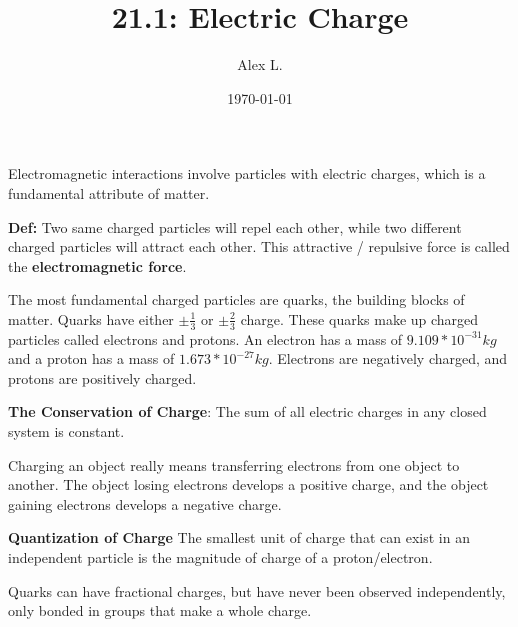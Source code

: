 \documentclass{article}
\title{21.1: Electric Charge}
\author{Alex L.}
\date{\today}
\begin{document}
\maketitle

Electromagnetic interactions involve particles with electric charges, which is a fundamental attribute of matter. 

\textbf{Def:}  Two same charged particles will repel each other, while two different charged particles will attract each other. This attractive / repulsive force is called the \textbf{electromagnetic force}.

The most fundamental charged particles are quarks, the building blocks of matter. Quarks have either $\pm \frac{1}{3}$ or $\pm \frac{2}{3}$ charge. These quarks make up charged particles called electrons and protons. An electron has a mass of $9.109 * 10^{-31} kg$ and a proton has a mass of $1.673 * 10^{-27} kg$. Electrons are negatively charged, and protons are positively charged.

\textbf{The Conservation of Charge}: The sum of all electric charges in any closed system is constant.

Charging an object really means transferring electrons from one object to another. The object losing electrons develops a positive charge, and the object gaining electrons develops a negative charge.

\textbf{Quantization of Charge} The smallest unit of charge that can exist in an independent particle is the magnitude of charge of a proton/electron.

Quarks can have fractional charges, but have never been observed independently, only bonded in groups that make a whole charge.
\end{document}
